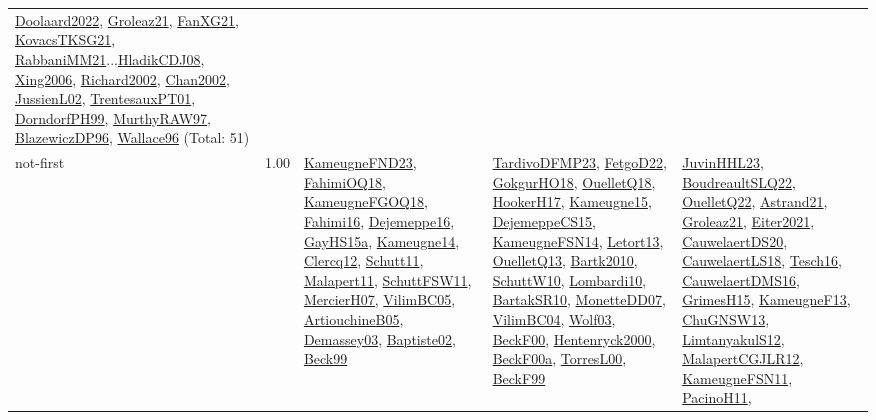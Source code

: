 {\begin{longtable}{p{3cm}r>{\raggedright\arraybackslash}p{6cm}>{\raggedright\arraybackslash}p{6cm}>{\raggedright\arraybackslash}p{8cm}}
\hyperref[detail:Doolaard2022]{Doolaard2022}, \hyperref[detail:Groleaz21]{Groleaz21}, \hyperref[detail:FanXG21]{FanXG21}, \hyperref[detail:KovacsTKSG21]{KovacsTKSG21}, \hyperref[detail:RabbaniMM21]{RabbaniMM21}...\hyperref[detail:HladikCDJ08]{HladikCDJ08}, \hyperref[detail:Xing2006]{Xing2006}, \hyperref[detail:Richard2002]{Richard2002}, \hyperref[detail:Chan2002]{Chan2002}, \hyperref[detail:JussienL02]{JussienL02}, \hyperref[detail:TrentesauxPT01]{TrentesauxPT01}, \hyperref[detail:DorndorfPH99]{DorndorfPH99}, \hyperref[detail:MurthyRAW97]{MurthyRAW97}, \hyperref[detail:BlazewiczDP96]{BlazewiczDP96}, \hyperref[detail:Wallace96]{Wallace96} (Total: 51)\\
\index{not-first}\index{Algorithms!not-first}not-first &  1.00 & \hyperref[detail:KameugneFND23]{KameugneFND23}, \hyperref[detail:FahimiOQ18]{FahimiOQ18}, \hyperref[detail:KameugneFGOQ18]{KameugneFGOQ18}, \hyperref[detail:Fahimi16]{Fahimi16}, \hyperref[detail:Dejemeppe16]{Dejemeppe16}, \hyperref[detail:GayHS15a]{GayHS15a}, \hyperref[detail:Kameugne14]{Kameugne14}, \hyperref[detail:Clercq12]{Clercq12}, \hyperref[detail:Schutt11]{Schutt11}, \hyperref[detail:Malapert11]{Malapert11}, \hyperref[detail:SchuttFSW11]{SchuttFSW11}, \hyperref[detail:MercierH07]{MercierH07}, \hyperref[detail:VilimBC05]{VilimBC05}, \hyperref[detail:ArtiouchineB05]{ArtiouchineB05}, \hyperref[detail:Demassey03]{Demassey03}, \hyperref[detail:Baptiste02]{Baptiste02}, \hyperref[detail:Beck99]{Beck99} & \hyperref[detail:TardivoDFMP23]{TardivoDFMP23}, \hyperref[detail:FetgoD22]{FetgoD22}, \hyperref[detail:GokgurHO18]{GokgurHO18}, \hyperref[detail:OuelletQ18]{OuelletQ18}, \hyperref[detail:HookerH17]{HookerH17}, \hyperref[detail:Kameugne15]{Kameugne15}, \hyperref[detail:DejemeppeCS15]{DejemeppeCS15}, \hyperref[detail:KameugneFSN14]{KameugneFSN14}, \hyperref[detail:Letort13]{Letort13}, \hyperref[detail:OuelletQ13]{OuelletQ13}, \hyperref[detail:Bartk2010]{Bartk2010}, \hyperref[detail:SchuttW10]{SchuttW10}, \hyperref[detail:Lombardi10]{Lombardi10}, \hyperref[detail:BartakSR10]{BartakSR10}, \hyperref[detail:MonetteDD07]{MonetteDD07}, \hyperref[detail:VilimBC04]{VilimBC04}, \hyperref[detail:Wolf03]{Wolf03}, \hyperref[detail:BeckF00]{BeckF00}, \hyperref[detail:Hentenryck2000]{Hentenryck2000}, \hyperref[detail:BeckF00a]{BeckF00a}, \hyperref[detail:TorresL00]{TorresL00}, \hyperref[detail:BeckF99]{BeckF99} & \hyperref[detail:JuvinHHL23]{JuvinHHL23}, \hyperref[detail:BoudreaultSLQ22]{BoudreaultSLQ22}, \hyperref[detail:OuelletQ22]{OuelletQ22}, \hyperref[detail:Astrand21]{Astrand21}, \hyperref[detail:Groleaz21]{Groleaz21}, \hyperref[detail:Eiter2021]{Eiter2021}, \hyperref[detail:CauwelaertDS20]{CauwelaertDS20}, \hyperref[detail:CauwelaertLS18]{CauwelaertLS18}, \hyperref[detail:Tesch16]{Tesch16}, \hyperref[detail:CauwelaertDMS16]{CauwelaertDMS16}, \hyperref[detail:GrimesH15]{GrimesH15}, \hyperref[detail:KameugneF13]{KameugneF13}, \hyperref[detail:ChuGNSW13]{ChuGNSW13}, \hyperref[detail:LimtanyakulS12]{LimtanyakulS12}, \hyperref[detail:MalapertCGJLR12]{MalapertCGJLR12}, \hyperref[detail:KameugneFSN11]{KameugneFSN11}, \hyperref[detail:PacinoH11]{PacinoH11}, 
\end{longtable}}
